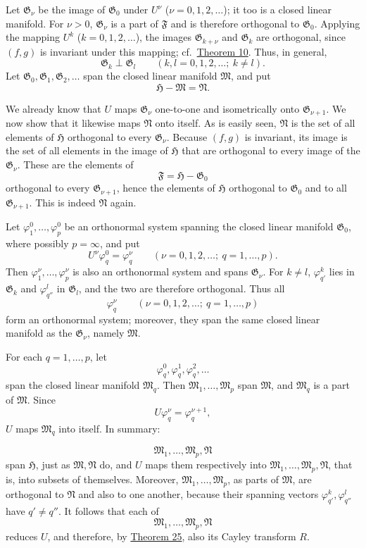 ﻿\documentclass[paper=b5,fontsize=13pt,bookmarkpackage=false,twoside]{scrartcl}
\begin{document}
Let $\mathfrak G_\nu$ be the image of $\mathfrak G_0$ under $U^\nu$ ($\nu=0,1,2,\ldots$); it too is a closed linear manifold. For $\nu>0$, $\mathfrak G_\nu$ is a part of $\mathfrak F$ and is therefore orthogonal to $\mathfrak G_0$. Applying the mapping $U^k$ ($k=0,1,2,\ldots$), the images $\mathfrak G_{k+\nu}$ and $\mathfrak G_k$ are orthogonal, since $(f,g)$ is invariant under this mapping; cf.\ \hyperref[thm:10]{Theorem 10}. Thus, in general,
\[
\mathfrak G_k\perp\mathfrak G_l
\qquad(k,l=0,1,2,\ldots;\ k\ne l).
\]
Let $\mathfrak G_0,\mathfrak G_1,\mathfrak G_2,\ldots$ span the closed linear manifold $\mathfrak M$, and put
\[
\mathfrak H-\mathfrak M=\mathfrak N.
\]

We already know that $U$ maps $\mathfrak G_\nu$ one-to-one and isometrically onto $\mathfrak G_{\nu+1}$. We now show that it likewise maps $\mathfrak N$ onto itself. As is easily seen, $\mathfrak N$ is the set of all elements of $\mathfrak H$ orthogonal to every $\mathfrak G_\nu$. Because $(f,g)$ is invariant, its image is the set of all elements in the image of $\mathfrak H$ that are orthogonal to every image of the $\mathfrak G_\nu$. These are the elements of
\[
\mathfrak F=\mathfrak H-\mathfrak G_0
\]
orthogonal to every $\mathfrak G_{\nu+1}$, hence the elements of $\mathfrak H$ orthogonal to $\mathfrak G_0$ and to all $\mathfrak G_{\nu+1}$. This is indeed $\mathfrak N$ again.

Let $\varphi_1^0,\ldots,\varphi_p^0$ be an orthonormal system spanning the closed linear manifold $\mathfrak G_0$, where possibly $p=\infty$, and put
\[
U^\nu\varphi_q^0=\varphi_q^\nu
\qquad
(\nu=0,1,2,\ldots;\ q=1,\ldots,p).
\]
Then $\varphi_1^\nu,\ldots,\varphi_p^\nu$ is also an orthonormal system and spans $\mathfrak G_\nu$. For $k\ne l$, $\varphi_{q'}^k$ lies in $\mathfrak G_k$ and $\varphi_{q''}^l$ in $\mathfrak G_l$, and the two are therefore orthogonal. Thus all
\[
\varphi_q^\nu
\qquad
(\nu=0,1,2,\ldots;\ q=1,\ldots,p)
\]
form an orthonormal system; moreover, they span the same closed linear manifold as the $\mathfrak G_\nu$, namely $\mathfrak M$.

For each $q=1,\ldots,p$, let
\[
\varphi_q^0,\varphi_q^1,\varphi_q^2,\ldots
\]
span the closed linear manifold $\mathfrak M_q$. Then $\mathfrak M_1,\ldots,\mathfrak M_p$ span $\mathfrak M$, and $\mathfrak M_q$ is a part of $\mathfrak M$. Since
\[
U\varphi_q^\nu=\varphi_q^{\nu+1},
\]
$U$ maps $\mathfrak M_q$ into itself. In summary:

\[
\mathfrak M_1,\ldots,\mathfrak M_p,\mathfrak N
\]
span $\mathfrak H$, just as $\mathfrak M,\mathfrak N$ do, and $U$ maps them respectively into $\mathfrak M_1,\ldots,\mathfrak M_p,\mathfrak N$, that is, into subsets of themselves. Moreover, $\mathfrak M_1,\ldots,\mathfrak M_p$, as parts of $\mathfrak M$, are orthogonal to $\mathfrak N$ and also to one another, because their spanning vectors $\varphi_{q'}^k,\varphi_{q''}^l$ have $q'\ne q''$. It follows that each of
\[
\mathfrak M_1,\ldots,\mathfrak M_p,\mathfrak N
\]
reduces $U$, and therefore, by \hyperref[thm:25]{Theorem 25}, also its Cayley transform $R$.
\end{document}
